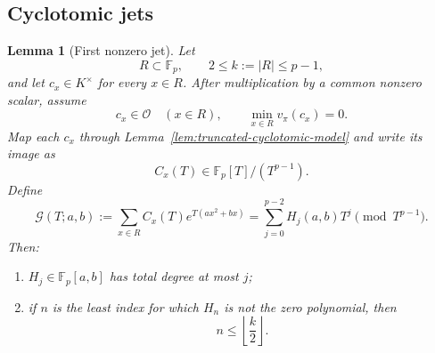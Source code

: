 \documentclass[11pt]{article}
\newtheorem{lemma}[theorem]{Lemma}
\newcommand{\F}{\mathbb F}
\begin{document}
\subsection{Cyclotomic jets}

\begin{lemma}[First nonzero jet]
\label{lem:first-nonzero-jet}
Let
\[
 R\subset\F_p,\qquad 2\le k:=|R|\le p-1,
\]
and let \(c_x\in K^\times\) for every \(x\in R\).  After multiplication by a common
nonzero scalar, assume
\begin{equation}
 c_x\in\mathcal O
 \quad(x\in R),
 \qquad
 \min_{x\in R}v_\pi(c_x)=0.
 \label{eq:primitive-c-rigorous}
\end{equation}
Map each \(c_x\) through Lemma~\ref{lem:truncated-cyclotomic-model} and
write its image as
\[
 C_x(T)\in\F_p[T]/(T^{p-1}).
\]
Define
\begin{equation}
 \mathcal G(T;a,b)
 :=
 \sum_{x\in R}
 C_x(T)e^{T(a x^2+b x)}
 =
 \sum_{j=0}^{p-2}H_j(a,b)T^j
 \pmod{T^{p-1}}.
 \label{eq:G-rigorous}
\end{equation}
Then:

\begin{enumerate}
\item \(H_j\in\F_p[a,b]\) has total degree at most \(j\);
\item if \(n\) is the least index for which \(H_n\) is not the zero
polynomial, then
\begin{equation}
 n\le\left\lfloor\frac{k}{2}\right\rfloor.
 \label{eq:n-rigorous}
\end{equation}
\end{enumerate}
\end{lemma}
\end{document}
